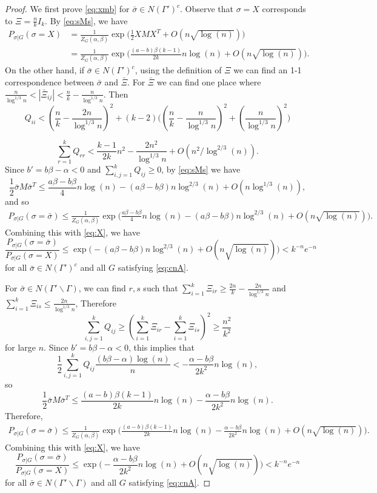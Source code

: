 \documentclass{article}
\begin{document}
\begin{proof}
We first prove \eqref{eq:xmb} for $\bar{\sigma}\in N(\Gamma')^c$.
Observe that $\sigma=X$ corresponds to $\Xi=\frac{n}{k} I_k$. By \eqref{eq:sMs}, we have
\begin{equation} \label{eq:X}
\begin{aligned}
P_{\sigma|G}(\sigma=X) & =\frac{1}{Z_G(\alpha,\beta)}
\exp\Big(\frac{1}{2} X M X^T + O(n\sqrt{\log(n)}) \Big)  \\
& =\frac{1}{Z_G(\alpha,\beta)}
\exp\Big(\frac{(a-b)\beta(k-1)}{2k}n\log(n) + O(n\sqrt{\log(n)}) \Big) .
\end{aligned}
\end{equation}
On the other hand, if $\bar{\sigma}\in N(\Gamma')^c$, using the definition of $\Xi$ we can find an 1-1 correspondence
between $\bar{\sigma}$ and $\bar{\Xi}$. For $\bar{\Xi}$ we can find one place where 
$\frac{n}{\log^{1/3} n} < |\bar{\Xi}_{ij}| < \frac{n}{k}- \frac{n}{\log^{1/3} n}$. Then
$$
Q_{ii} < (\frac{n}{k}-\frac{2n}{\log^{1/3} n})^2 + (k-2)\Big( (\frac{n}{k} - \frac{n}{\log^{1/3} n})^2 + (\frac{n}{\log^{1/3} n})^2 \Big)
$$

$$
\sum_{r=1}^k Q_{rr} < \frac{k-1}{2k}n^2 - \frac{2n^2}{\log^{1/3} n}
+O(n^2/\log^{2/3}(n)).
$$
Since $b' = b\beta-\alpha<0$ and $\sum_{i,j=1}^k Q_{ij} \geq 0$, by \eqref{eq:sMs} we have
$$
\frac{1}{2}\bar{\sigma} M \bar{\sigma}^T  
\le \frac{a\beta-b\beta}{4}n\log(n)
-(a\beta-b\beta)n\log^{2/3}(n)
+O(n\log^{1/3}(n)) ,
$$
and so
\begin{align*}
P_{\sigma|G}(\sigma=\bar{\sigma}) \le \frac{1}{Z_G(\alpha,\beta)}
\exp\Big(\frac{a\beta-b\beta}{4}n\log(n) 
-(a\beta-b\beta)n\log^{2/3}(n)
+ O(n\sqrt{\log(n)}) \Big) .
\end{align*}
Combining this with \eqref{eq:X}, we have
$$
\frac{P_{\sigma|G}(\sigma=\bar{\sigma})}{P_{\sigma|G}(\sigma=X)}
\le \exp\Big(-(a\beta-b\beta)n\log^{2/3}(n)
+ O(n\sqrt{\log(n)}) \Big)
<k^{-n} e^{-n}
$$
for all $\bar{\sigma}\in N(\Gamma')^c$ and all $G$ satisfying \eqref{eq:cnA}. 

For $\bar{\sigma}\in N(\Gamma' \backslash \Gamma)$, we can find $r,s$ such that
$\sum_{i=1}^k \Xi_{ir} \geq \frac{2n}{k} - \frac{2n}{\log^{1/3} n }$ and 
$\sum_{i=1}^k \Xi_{is} \leq \frac{2n}{\log^{1/3} n }$, Therefore
$$
\sum_{i,j=1}^k Q_{ij} \geq (\sum_{i=1}^k \Xi_{ir} - \sum_{i=1}^k \Xi_{is})^2 \geq \frac{n^2}{k^2}
$$
for large $n$. Since $b' = b\beta-\alpha<0$, this implies that
$$
\frac{1}{2}\sum_{i,j=1}^k Q_{ij}
\frac{(b\beta-\alpha)\log(n)}{n}
< - \frac{\alpha-b\beta}{2k^2} n\log(n) ,
$$
so
$$
\frac{1}{2}\bar{\sigma} M \bar{\sigma}^T  
\le \frac{(a-b)\beta(k-1)}{2k}n\log(n)
- \frac{\alpha-b\beta}{2k^2} n\log(n) .
$$
Therefore,
\begin{align*}
P_{\sigma|G}(\sigma=\bar{\sigma}) \le \frac{1}{Z_G(\alpha,\beta)}
\exp\Big(\frac{(a-b)\beta(k-1)}{2k}n\log(n) 
-\frac{\alpha-b\beta}{2k^2} n\log(n)
+ O(n\sqrt{\log(n)}) \Big) .
\end{align*}
Combining this with \eqref{eq:X}, we have
$$
\frac{P_{\sigma|G}(\sigma=\bar{\sigma})}{P_{\sigma|G}(\sigma=X)}
\le \exp\Big(-\frac{\alpha-b\beta}{2k^2} n\log(n)
+ O(n\sqrt{\log(n)}) \Big)
<k^{-n} e^{-n}
$$
for all $\bar{\sigma}\in N(\Gamma' \backslash \Gamma)$ and all $G$ satisfying \eqref{eq:cnA}.


\end{proof}
\end{document}
